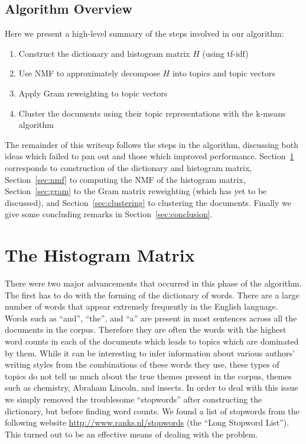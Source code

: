 \documentclass[fleqn,10pt]{../SelfArx} %
\begin{document}
\subsection{Algorithm Overview}\label{sec:alg_overview}
Here we present a high-level summary of the steps involved in our algorithm:
\begin{enumerate}
	\item Construct the dictionary and histogram matrix $H$ (using tf-idf)
	\item Use NMF to approximately decompose $H$ into topics and topic vectors
	\item Apply Gram reweighting to topic vectors
	\item Cluster the documents using their topic representations with the k-means algorithm
\end{enumerate}

The remainder of this writeup follows the steps in the algorithm, discussing both ideas which failed to pan out and those which improved performance. Section~\ref{sec:histogram} corresponds to construction of the dictionary and histogram matrix, Section~\ref{sec:nmf} to computing the NMF of the histogram matrix, Section~\ref{sec:gram} to the Gram matrix reweighting (which has yet to be discussed), and Section~\ref{sec:clustering} to clustering the documents. Finally we give some concluding remarks in Section~\ref{sec:conclusion}.




\section{The Histogram Matrix} %
\label{sec:histogram}
There were two major advancements that occurred in this phase of the algorithm. The first has to do with the forming of the dictionary of words. There are a large number of words that appear extremely frequently in the English language. Words such as ``and'', ``the'', and ``a'' are present in most sentences across all the documents in the corpus. Therefore they are often the words with the highest word counts in each of the documents which leads to topics which are dominated by them. While it can be interesting to infer information about various authors' writing styles from the combinations of these words they use, these types of topics do not tell us much about the true themes present in the corpus, themes such as chemistry, Abraham Lincoln, and insects. In order to deal with this issue we simply removed the troublesome ``stopwords'' after constructing the dictionary, but before finding word counts. We found a list of stopwords from the following website \url{http://www.ranks.nl/stopwords} (the ``Long Stopword List''). This turned out to be an effective means of dealing with the problem.
\end{document}
